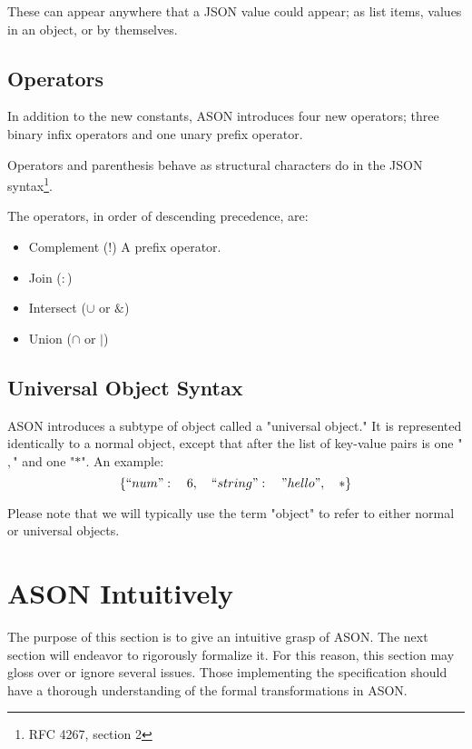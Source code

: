 \documentclass[letterpaper]{article}
\begin{document}
These can appear anywhere that a JSON value could appear; as list items, values
in an object, or by themselves.

\subsection{Operators}
In addition to the new constants, ASON introduces four new operators; three
binary infix operators and one unary prefix operator.

Operators and parenthesis behave as structural characters do in the JSON
syntax\footnote{RFC 4267, section 2}.

\begin{samepage}
The operators, in order of descending precedence, are:

\begin{itemize}
\item Complement (\(!\)) A prefix operator.
\item Join (\(:\))
\item Intersect (\(\cup\) or \(\&\))
\item Union (\(\cap\) or \(|\))
\end{itemize}
\end{samepage}

\begin{samepage}
\subsection{Universal Object Syntax}
ASON introduces a subtype of object called a "universal object." It is
represented identically to a normal object, except that after the list of
key-value pairs is one "\(,\)" and one "\(*\)". An example:
%
\begin{equation}
\{ ``num":\quad6,\quad ``string":\quad"hello",\quad *\}
\end{equation}
\end{samepage}

Please note that we will typically use the term "object" to refer to either
normal or universal objects.

\section{ASON Intuitively}
The purpose of this section is to give an intuitive grasp of ASON. The next
section will endeavor to rigorously formalize it. For this reason, this section
may gloss over or ignore several issues. Those implementing the specification
should have a thorough understanding of the formal transformations in ASON.
\end{document}
